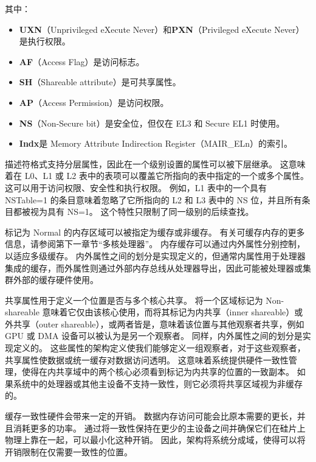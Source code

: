 
其中：

\begin{itemize}
\item
  \textbf{UXN}（Unprivileged eXecute Never）和\textbf{PXN}（Privileged
  eXecute Never）是执行权限。
\item
  \textbf{AF}（Access Flag）是访问标志。
\item
  \textbf{SH}（Shareable attribute）是可共享属性。
\item
  \textbf{AP}（Access Permission）是访问权限。
\item
  \textbf{NS}（Non-Secure bit）是安全位，但仅在 EL3 和 Secure EL1 时使用。
\item
  \textbf{Indx}是 Memory Attribute Indirection
  Register（MAIR\_ELn）的索引。
\end{itemize}

描述符格式支持分层属性，因此在一个级别设置的属性可以被下层继承。
这意味着在 L0、L1 或 L2 表中的表项可以覆盖它所指向的表中指定的一个或多个属性。
这可以用于访问权限、安全性和执行权限。
例如，L1 表中的一个具有 NSTable=1 的条目意味着忽略了它所指向的 L2 和 L3 表中的 NS 位，并且所有条目都被视为具有 NS=1。
这个特性只限制了同一级别的后续查找。


标记为 Normal 的内存区域可以被指定为缓存或非缓存。
有关可缓存内存的更多信息，请参阅第下一章节“多核处理器”。
内存缓存可以通过内外属性分别控制，以适应多级缓存。
内外属性之间的划分是实现定义的，但通常内属性用于处理器集成的缓存，而外属性则通过外部内存总线从处理器导出，因此可能被处理器或集群外部的缓存硬件使用。

共享属性用于定义一个位置是否与多个核心共享。
将一个区域标记为 Non-shareable 意味着它仅由该核心使用，而将其标记为内共享（inner shareable）或外共享（outer shareable），或两者皆是，意味着该位置与其他观察者共享，例如 GPU 或 DMA 设备可以被认为是另一个观察者。
同样，内外属性之间的划分是实现定义的。
这些属性的架构定义使我们能够定义一组观察者，对于这些观察者，共享属性使数据或统一缓存对数据访问透明。
这意味着系统提供硬件一致性管理，使得在内共享域中的两个核心必须看到标记为内共享的位置的一致副本。
如果系统中的处理器或其他主设备不支持一致性，则它必须将共享区域视为非缓存的。


缓存一致性硬件会带来一定的开销。
数据内存访问可能会比原本需要的更长，并且消耗更多的功率。
通过将一致性保持在更少的主设备之间并确保它们在硅片上物理上靠在一起，可以最小化这种开销。
因此，架构将系统分成域，使得可以将开销限制在仅需要一致性的位置。

